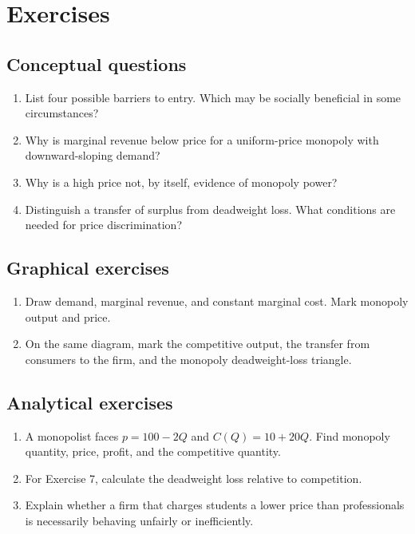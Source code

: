 \section*{Exercises}

\subsection*{Conceptual questions}
\begin{enumerate}[label=\arabic*.]
  \item List four possible barriers to entry. Which may be socially beneficial in some circumstances?
  \item Why is marginal revenue below price for a uniform-price monopoly with downward-sloping demand?
  \item Why is a high price not, by itself, evidence of monopoly power?
  \item Distinguish a transfer of surplus from deadweight loss. What conditions are needed for price discrimination?
\end{enumerate}

\subsection*{Graphical exercises}
\begin{enumerate}[resume,label=\arabic*.]
  \item Draw demand, marginal revenue, and constant marginal cost. Mark monopoly output and price.
  \item On the same diagram, mark the competitive output, the transfer from consumers to the firm, and the monopoly deadweight-loss triangle.
\end{enumerate}

\subsection*{Analytical exercises}
\begin{enumerate}[resume,label=\arabic*.]
  \item A monopolist faces $p=100-2Q$ and $C(Q)=10+20Q$. Find monopoly quantity, price, profit, and the competitive quantity.
  \item For Exercise 7, calculate the deadweight loss relative to competition.
  \item Explain whether a firm that charges students a lower price than professionals is necessarily behaving unfairly or inefficiently.
\end{enumerate}

